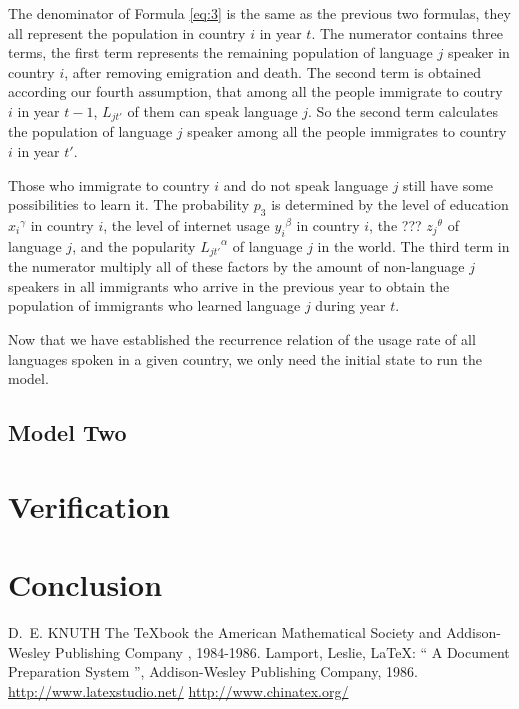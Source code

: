 \documentclass{mcmthesis}
\begin{document}
The denominator of Formula \ref{eq:3} is the same as the previous two formulas, they all represent the population in country $i$ in year $t$. The numerator contains three terms, the first term represents the remaining population of language $j$ speaker in country $i$, after removing emigration and death. The second term is obtained according our fourth assumption, that among all the people immigrate to coutry $i$ in year $t-1$, $L_{jt'}$ of them can speak language $j$. So the second term calculates the population of language $j$ speaker among all the people immigrates to country $i$ in year $t'$.

Those who immigrate to country $i$ and do not speak language $j$ still have some possibilities to learn it. The probability $p_3$ is determined by the level of education ${x_i}^\gamma$ in country $i$, the level of internet usage ${y_i}^\beta$ in country $i$, the ??? ${z_j}^\theta$ of language $j$, and the popularity ${L_{jt'}}^\alpha$ of language $j$ in the world. The third term in the numerator multiply all of these factors by the amount of non-language $j$ speakers in all immigrants who arrive in the previous year to obtain the population of immigrants who learned language $j$ during year $t$.

Now that we have established the recurrence relation of the usage rate of all languages spoken in a given country, we only need the initial state to run the model.


\subsection{Model Two}

\section{Verification}
\section{Conclusion}

\begin{thebibliography}{99}
 D.~E. KNUTH   The \TeX{}book  the American
Mathematical Society and Addison-Wesley
Publishing Company , 1984-1986.
Lamport, Leslie,  \LaTeX{}: `` A Document Preparation System '',
Addison-Wesley Publishing Company, 1986.
\url{http://www.latexstudio.net/}
\url{http://www.chinatex.org/}
\end{thebibliography}
\end{document}
